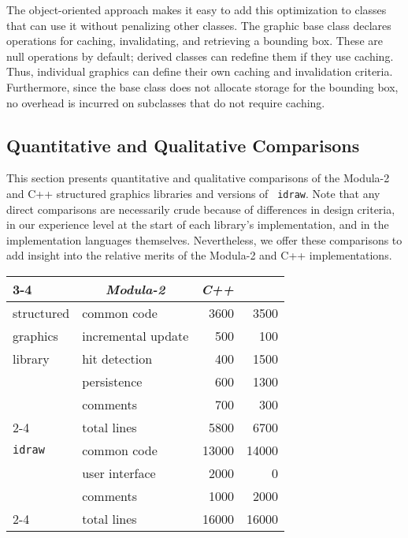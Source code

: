 The object-oriented approach makes it easy to add this optimization to
classes that can use it without penalizing other classes.  The graphic base
class declares operations for caching, invalidating, and retrieving a
bounding box.  These are null operations by default; derived classes can
redefine them if they use caching.  Thus, individual graphics can define
their own caching and invalidation criteria.  Furthermore, since the base
class does not allocate storage for the bounding box, no overhead is
incurred on subclasses that do not require caching.

\subsection{Quantitative and Qualitative Comparisons}

This section presents quantitative and qualitative comparisons of the
\mbox{Modula-2} and C++ structured graphics libraries and versions of {\tt
idraw}.  Note that any direct comparisons are necessarily crude because of
differences in design criteria, in our experience level at the start of each
library's implementation, and in the implementation languages themselves.
Nevertheless, we offer
these comparisons to add insight into the relative merits of the
\mbox{Modula-2} and C++ implementations.

\begin{table*}[t]
\begin{center}
\begin{tabular}{|l|l|r|r|} \cline{3-4}
    \multicolumn{2}{c|}{} & \multicolumn{1}{c|}{{\em Modula-2}} 
	& \multicolumn{1}{c|}{{\em C++}}
	\\ \hline
    structured & common code & 3600 & 3500
	\\
    graphics & incremental update & 500 & 100
	\\
    library & hit detection & 400 & 1500
	\\
	& persistence & 600 & 1300
	\\
	& comments & 700 & 300
	\\ \cline{2-4}
	& total lines & 5800 & 6700
	\\ \hline
    {\tt idraw} & common code & 13000 & 14000
	\\
	& user interface & 2000 & 0
	\\
	& comments & 1000 & 2000
	\\ \cline{2-4}
	& total lines & 16000 & 16000
	\\ \hline
\end{tabular}
\caption{
    Comparison of \mbox{Modula-2} and C++ source code (in lines)
}
\label{codeSizes}
\end{center}
\end{table*}

